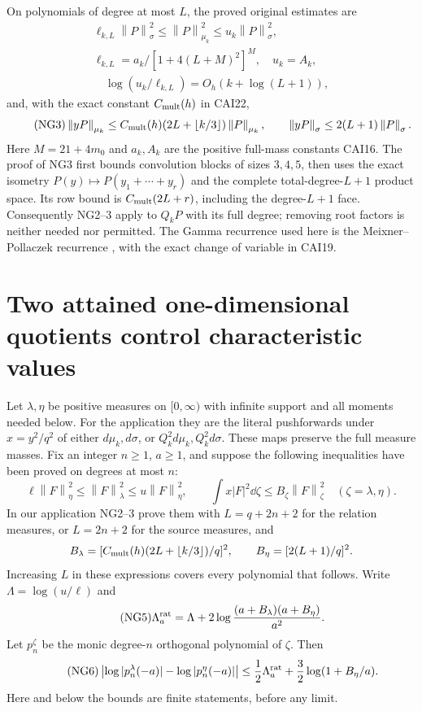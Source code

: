 \documentclass[11pt]{article}
\newcommand{\norm}[1]{\left\lVert#1\right\rVert}
\begin{document}
On polynomials of degree at most $L$, the proved original estimates are
\begin{equation}\tag{NG2}
 \begin{gathered}
 \ell_{k,L}\norm P_\sigma^2\le\norm P_{\mu_k}^2
 \le u_k\norm P_\sigma^2,\\
 \ell_{k,L}=a_k/[1+4(L+M)^2]^M,
 \quad u_k=A_k,\\
 \quad \log(u_k/\ell_{k,L})=O_h(k+\log(L+1)),
 \end{gathered}
\end{equation}
and, with the exact constant $C_{\rm mult}(h)$ in CAI22,
\begin{equation}\tag{NG3}
 \norm{yP}_{\mu_k}\le C_{\rm mult}(h)(2L+\lfloor k/3\rfloor)
                    \norm P_{\mu_k},\qquad
 \norm{yP}_\sigma\le2(L+1)\norm P_\sigma.
\end{equation}
Here $M=21+4m_0$ and $a_k,A_k$ are the positive full-mass constants
CAI16. The proof of NG3 first bounds convolution blocks of sizes $3,4,5$,
then uses the exact isometry $P(y)\mapsto P(y_1+\cdots+y_r)$ and the
complete total-degree-$L+1$ product space. Its row bound is
$C_{\rm mult}(2L+r)$, including the degree-$L+1$ face. Consequently
NG2--3 apply to $Q_kP$ with its full degree; removing root factors is
neither needed nor permitted. The Gamma recurrence used here is the
Meixner--Pollaczek recurrence \cite[18.22.8,18.23.7]{dlmf}, with the exact
change of variable in CAI19.

\section{Two attained one-dimensional quotients control characteristic values}
Let $\lambda,\eta$ be positive measures on $[0,\infty)$ with infinite
support and all moments needed below. For the application they are the
literal pushforwards under $x=y^2/q^2$ of either $d\mu_k,d\sigma$, or
$Q_k^2d\mu_k,Q_k^2d\sigma$. These maps preserve the full measure masses.
Fix an integer $n\ge1$, $a\ge1$, and suppose the following inequalities
have been proved on degrees at most $n$:
\begin{equation}\tag{NG4}
 \ell\norm F_\eta^2\le\norm F_\lambda^2\le u\norm F_\eta^2,
 \qquad \int x|F|^2\dd\zeta\le B_\zeta\norm F_\zeta^2
 \quad(\zeta=\lambda,\eta).
\end{equation}
In our application NG2--3 prove them with
$L=q+2n+2$ for the relation measures, or $L=2n+2$ for the source measures,
and
\[
 B_\lambda=[C_{\rm mult}(h)(2L+\lfloor k/3\rfloor)/q]^2,
 \qquad B_\eta=[2(L+1)/q]^2.
\]
Increasing $L$ in these expressions covers every polynomial that follows.
Write $\Lambda=\log(u/\ell)$ and
\begin{equation}\tag{NG5}
 \Lambda_a^{\rm rat}=\Lambda+
       2\log\frac{(a+B_\lambda)(a+B_\eta)}{a^2}.
\end{equation}
Let $p_n^\zeta$ be the monic degree-$n$ orthogonal polynomial of $\zeta$.
Then
\begin{equation}\tag{NG6}
 \left|\log|p_n^\lambda(-a)|-\log|p_n^\eta(-a)|\right|
 \le\frac12\Lambda_a^{\rm rat}
                   +\frac32\log(1+B_\eta/a).
\end{equation}
Here and below the bounds are finite statements, before any limit.
\end{document}
